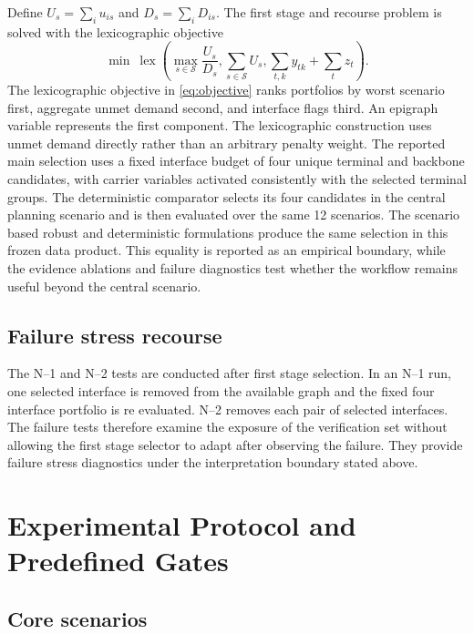 \documentclass{ieeeaccess}
\begin{document}
Define $U_s=\sum_i u_{is}$ and $D_s=\sum_iD_{is}$. The first stage and recourse problem is solved with the lexicographic objective
\begin{equation}
\min\ \operatorname{lex}\left(
\max_{s\in\mathcal{S}}\frac{U_s}{D_s},
\sum_{s\in\mathcal{S}}U_s,
\sum_{t,k}y_{tk}+\sum_tz_t
\right).
\label{eq:objective}
\end{equation}
The lexicographic objective in \eqref{eq:objective} ranks portfolios by worst scenario first, aggregate unmet demand second, and interface flags third.
An epigraph variable represents the first component. The lexicographic construction uses unmet demand directly rather than an arbitrary penalty weight. The reported main selection uses a fixed interface budget of four unique terminal and backbone candidates, with carrier variables activated consistently with the selected terminal groups. The deterministic comparator selects its four candidates in the central planning scenario and is then evaluated over the same 12 scenarios. The scenario based robust and deterministic formulations produce the same selection in this frozen data product. This equality is reported as an empirical boundary, while the evidence ablations and failure diagnostics test whether the workflow remains useful beyond the central scenario.

\subsection{Failure stress recourse}

The N--1 and N--2 tests are conducted after first stage selection. In an N--1 run, one selected interface is removed from the available graph and the fixed four interface portfolio is re evaluated. N--2 removes each pair of selected interfaces. The failure tests therefore examine the exposure of the verification set without allowing the first stage selector to adapt after observing the failure. They provide failure stress diagnostics under the interpretation boundary stated above.

\section{Experimental Protocol and Predefined Gates}
\label{sec:protocol}

\subsection{Core scenarios}
\end{document}
